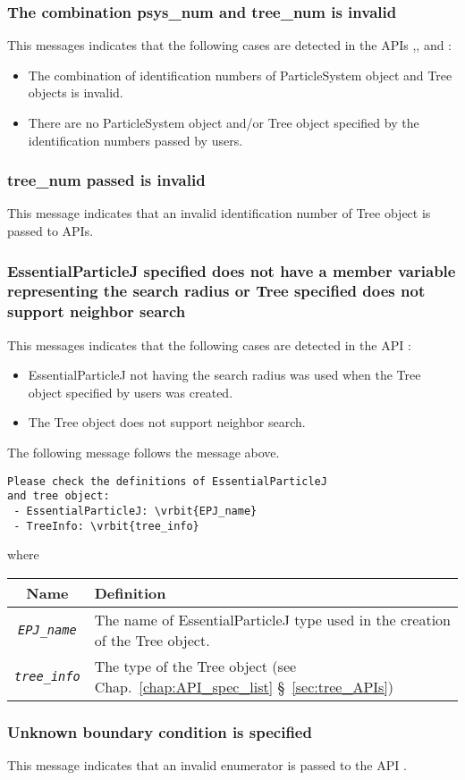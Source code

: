 \subsubsection{The combination psys\_num and tree\_num is invalid}
This messages indicates that the following cases are detected in the APIs ,, and :
\begin{itemize}[leftmargin=*,itemsep=-1ex]
\item The combination of identification numbers of ParticleSystem object and Tree objects is invalid.
\item There are no ParticleSystem object and/or Tree object specified by the identification numbers passed by users.
\end{itemize}

\subsubsection{tree\_num passed is invalid}
This message indicates that an invalid identification number of Tree object is passed to APIs.

\subsubsection{EssentialParticleJ specified does not have a member variable representing the search radius or Tree specified does not support neighbor search}
This messages indicates that the following cases are detected in the API :
\begin{itemize}[leftmargin=*,itemsep=-1ex]
\item EssentialParticleJ not having the search radius was used when the Tree object specified by users was created. 
\item The Tree object does not support neighbor search.
\end{itemize}

The following message follows the message above.
\begin{screen}
\begin{Verbatim}[commandchars=\\\{\}]
Please check the definitions of EssentialParticleJ
and tree object:
 - EssentialParticleJ: \vrbit{EPJ_name}
 - TreeInfo: \vrbit{tree_info}
\end{Verbatim}
\end{screen}
where
\begin{table}[H]
\begin{tabularx}{\linewidth}{cX}
\toprule
\rowcolor{Snow2}
Name & Definition \\
\midrule
\textit{\texttt{EPJ\_name}} & The name of EssentialParticleJ type used in the creation of the Tree object. \\
\textit{\texttt{tree\_info}} & The type of the Tree object (see Chap.~\ref{chap:API_spec_list} \S~\ref{sec:tree_APIs}) \\
\bottomrule
\end{tabularx}
\end{table}

\subsubsection{Unknown boundary condition is specified}
This message indicates that an invalid enumerator is passed to the API .
